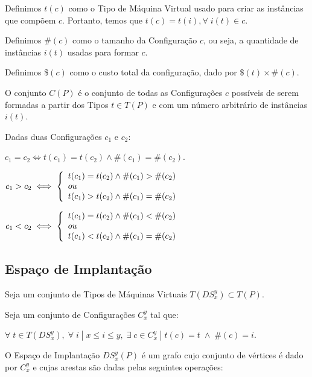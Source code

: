 Definimos $t(c)$ como o Tipo de Máquina Virtual usado para criar as instâncias 
que compõem $c$. Portanto, temos que $t(c) = t(i), \forall \; i(t) \in c$. 

Definimos $\#(c)$ como o tamanho da Configuração $c$, ou seja, a quantidade de 
instâncias $i(t)$ usadas para formar $c$.

Definimos \$$(c)$ como o custo total da configuração, dado por \$$(t) \times \#(c)$.

O conjunto $C(P)$ é o conjunto de todas as Configurações $c$ possíveis de serem 
formadas a partir dos Tipos $t \in T(P)$ e com um número arbitrário de instâncias 
$i(t)$.

Dadas duas Configurações $c_1$ e $c_2$:

$c_1 = c_2 \iff t(c_1) = t(c_2) \land \#(c_1) = \#(c_2)$.

$ c_1 > c_2 \iff \left\{
  \begin{array}{l l}
    t(c_1) = t(c_2) \land \#(c_1) > \#(c_2)\\
    ou\\
    t(c_1) > t(c_2) \land \#(c_1) = \#(c_2)
  \end{array} \right.$
  
$ c_1 < c_2 \iff \left\{
  \begin{array}{l l}
    t(c_1) = t(c_2) \land \#(c_1) < \#(c_2)\\
    ou\\
    t(c_1) < t(c_2) \land \#(c_1) = \#(c_2)
  \end{array} \right.$

\subsection{Espaço de Implantação}
Seja um conjunto de Tipos de Máquinas Virtuais $T(DS_x^y) \subset T(P)$.

Seja um conjunto de Configurações $C_x^y$ tal que:
 
$\forall \; t \in T(DS_x^y), \; \forall \; i \; | \; x \leq i \leq y, \; \exists \; c \in C_x^y \; | \; t(c) = t \; \land \; \#(c) = i$.
 
O Espaço de Implantação $DS_x^y(P)$ é um grafo cujo conjunto de vértices é dado 
por $C_x^y$ e cujas arestas são dadas pelas seguintes operações:

